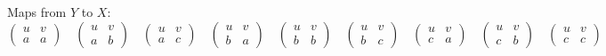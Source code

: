 \begin{solution}
    Maps from \(Y\) to \(X\):
    \[\begin{pmatrix}
            u & v \\
            a & a
        \end{pmatrix} \quad
        \begin{pmatrix}
            u & v \\
            a & b
        \end{pmatrix} \quad
        \begin{pmatrix}
            u & v \\
            a & c
        \end{pmatrix} \quad
        \begin{pmatrix}
            u & v \\
            b & a
        \end{pmatrix} \quad
        \begin{pmatrix}
            u & v \\
            b & b
        \end{pmatrix} \quad
        \begin{pmatrix}
            u & v \\
            b & c
        \end{pmatrix} \quad
        \begin{pmatrix}
            u & v \\
            c & a
        \end{pmatrix} \quad
        \begin{pmatrix}
            u & v \\
            c & b
        \end{pmatrix} \quad
        \begin{pmatrix}
            u & v \\
            c & c
        \end{pmatrix}\]
\end{solution}

